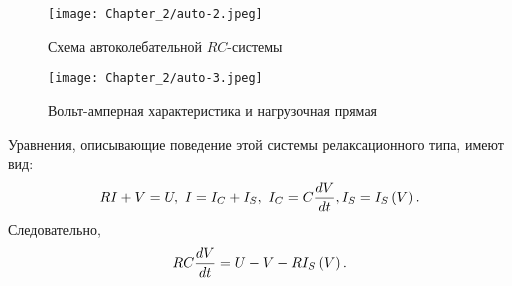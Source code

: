 \begin{figure}
	\centering
	\texttt{[image: Chapter\_2/auto-2.jpeg]}
	\caption{Схема автоколебательной $RC$-системы}
\end{figure}

\begin{figure}
	\centering
	\texttt{[image: Chapter\_2/auto-3.jpeg]}
	\caption{Вольт-амперная характеристика и нагрузочная прямая}						
\end{figure}


Уравнения, описывающие поведение этой системы релаксационного типа,
имеют вид:
\begin{equation} 
	\eqmark{auto-4}
	RI+V=U,~ I=I_C+I_S,~ I_C=C\frac{dV}{dt}, I_S=I_S\left( V \right). 
\end{equation}
Следовательно,
\begin{equation} 
	\eqmark{auto-5}
	RC\frac{dV}{dt}=U-V-R{{I}_{S}}\left( V \right).
\end{equation}

